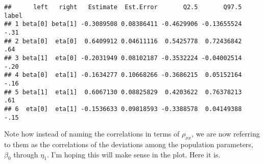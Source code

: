 \documentclass[]{article}
\begin{document}
\begin{verbatim}
##      left   right   Estimate  Est.Error       Q2.5       Q97.5 label
## 1 beta[0] beta[1] -0.3089508 0.08386411 -0.4629906 -0.13655524  -.31
## 2 beta[0]  eta[0]  0.6409912 0.04611116  0.5425778  0.72436842   .64
## 3 beta[1]  eta[0] -0.2031949 0.08102187 -0.3532224 -0.04002514  -.20
## 4 beta[0]  eta[1] -0.1634277 0.10668266 -0.3686215  0.05152164  -.16
## 5 beta[1]  eta[1]  0.6067130 0.08825829  0.4203622  0.76378213   .61
## 6  eta[0]  eta[1] -0.1536633 0.09818593 -0.3388578  0.04149388  -.15
\end{verbatim}

Note how instead of naming the correlations in terms of \(\rho_{xx}\),
we are now referring to them as the correlations of the deviations among
the population parameters, \(\beta_0\) through \(\eta_1\). I'm hoping
this will make sense in the plot. Here it is.
\end{document}
